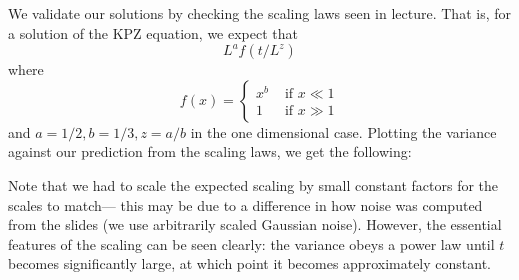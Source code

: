 \documentclass[12pt]{article}
\begin{document}
We validate our solutions by checking the scaling laws seen in lecture. That is, for a solution of the KPZ equation, we expect that 
\[L^a f(t/L^z)\]
where 
\[f(x) = \begin{cases}x^b & \text{ if $x \ll 1$} \\ 1 & \text{ if $x \gg 1$} \end{cases}\]
and $a = 1/2, b = 1/3, z = a/b$ in the one dimensional case.
Plotting the variance against our prediction from the scaling laws, we get the following:
\begin{figure}[H]
\end{figure}
\noindent Note that we had to scale the expected scaling by small constant factors for the scales to match--- this may be due to a difference in how noise was computed from the slides (we use arbitrarily scaled Gaussian noise). 
However, the essential features of the scaling can be seen clearly: the variance obeys a power law until $t$ becomes significantly large, at which point it becomes approximately constant.
\end{document}
